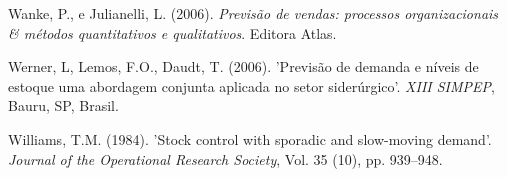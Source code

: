 \documentclass{book}
\begin{document}
\begin{thebibliography}{12}
Wanke, P., e Julianelli, L. (2006). {\it Previsão de vendas: processos organizacionais \& métodos quantitativos e
qualitativos}. Editora Atlas.

Werner, L, Lemos, F.O., Daudt, T. (2006). 'Previsão de demanda e níveis de estoque uma abordagem conjunta aplicada no setor siderúrgico'. {\it XIII SIMPEP}, Bauru, SP, Brasil.

Williams, T.M. (1984). 'Stock control with sporadic and slow-moving demand'. {\it Journal of the Operational Research Society}, Vol. 35 (10), pp. 939–948. 

\end{thebibliography}
\end{document}
